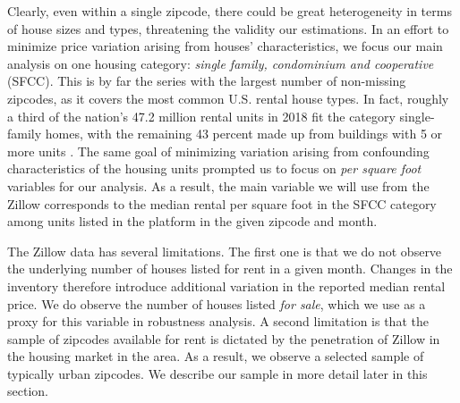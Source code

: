 Clearly, even within a single zipcode, there could be great heterogeneity in terms of 
house sizes and types, threatening the validity our estimations. In an effort to 
minimize price variation arising from houses' characteristics, we focus our main 
analysis on one housing category: \textit{single family, condominium and cooperative} 
(SFCC). This is by far the series with the largest number of non-missing zipcodes, as 
it covers the most common U.S. rental house types. In fact, roughly a third of the 
nation's 47.2 million rental units in 2018 fit the category single-family homes, with 
the remaining 43 percent made up from buildings with 5 or more units 
\parencite{fernald2020americas}. The same goal of minimizing variation arising from confounding
characteristics of the housing units prompted us to focus on \textit{per square foot} 
variables for our analysis. As a result, the main variable we will use from the Zillow
corresponds to the median rental per square foot in the SFCC category among units 
listed in the platform in the given zipcode and month.

The Zillow data has several limitations. The first one is that we do not observe the 
underlying number of houses listed for rent in a given month. Changes in the inventory 
therefore introduce additional variation in the reported median rental price. We do 
observe the number of houses listed \textit{for sale}, which we use as a proxy for this 
variable in robustness analysis. A second limitation is that the sample of zipcodes 
available for rent is dictated by the penetration of Zillow in the housing market in the 
area. As a result, we observe a selected sample of typically urban zipcodes. We describe 
our sample in more detail later in this section.

